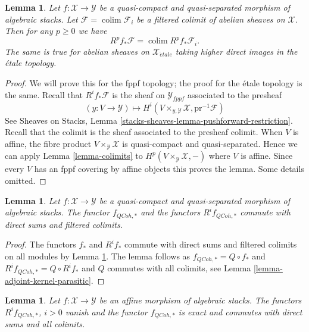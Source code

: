 \documentclass{stacks-project}
\theoremstyle{plain}
\newtheorem{lemma}[subsection]{Lemma}
\theoremstyle{definition}
\theoremstyle{remark}
\numberwithin{equation}{subsection}
\def\colim{\mathop{\mathrm{colim}}\nolimits}
\def\etale{{\acute{e}tale}}
\def\QCoh{\mathit{QCoh}}
\begin{document}
\begin{lemma}
\label{lemma-colimit-cohomology}
Let $f : \mathcal{X} \to \mathcal{Y}$ be a quasi-compact and quasi-separated
morphism of algebraic stacks. Let $\mathcal{F} = \colim \mathcal{F}_i$
be a filtered colimit of abelian sheaves on $\mathcal{X}$.
Then for any $p \geq 0$ we have
$$
R^pf_*\mathcal{F} = \colim R^pf_*\mathcal{F}_i.
$$
The same is true for abelian sheaves on $\mathcal{X}_\etale$
taking higher direct images in the \'etale topology.
\end{lemma}

\begin{proof}
We will prove this for the fppf topology; the proof for the \'etale
topology is the same. Recall that $R^if_*\mathcal{F}$ is the sheaf on
$\mathcal{Y}_{fppf}$ associated to the presheaf
$$
(y : V \to \mathcal{Y})
\longmapsto
H^i(V \times_{y, \mathcal{Y}} \mathcal{X}, \text{pr}^{-1}\mathcal{F})
$$
See
Sheaves on Stacks, Lemma \ref{stacks-sheaves-lemma-pushforward-restriction}.
Recall that the colimit is the sheaf associated to the presheaf colimit.
When $V$ is affine, the fibre product $V \times_\mathcal{Y} \mathcal{X}$
is quasi-compact and quasi-separated. Hence we can apply
Lemma \ref{lemma-colimits} to $H^p(V \times_\mathcal{Y} \mathcal{X}, -)$
where $V$ is affine. Since every $V$ has an fppf covering by
affine objects this proves the lemma. Some details omitted.
\end{proof}

\begin{lemma}
\label{lemma-quasi-coherent-pushforward-direct-sums}
Let $f : \mathcal{X} \to \mathcal{Y}$ be a quasi-compact and quasi-separated
morphism of algebraic stacks. The functor $f_{\QCoh, *}$
and the functors $R^if_{\QCoh, *}$ commute with direct sums
and filtered colimits.
\end{lemma}

\begin{proof}
The functors $f_*$ and $R^if_*$ commute with direct sums and filtered
colimits on all modules by Lemma \ref{lemma-colimit-cohomology}.
The lemma follows as $f_{\QCoh, *} = Q \circ f_*$ and
$R^if_{\QCoh, *} = Q \circ R^if_*$ and $Q$ commutes with
all colimits, see Lemma \ref{lemma-adjoint-kernel-parasitic}.
\end{proof}

\begin{lemma}
\label{lemma-quasi-coherent-pushforward-affine}
Let $f : \mathcal{X} \to \mathcal{Y}$ be an affine morphism of algebraic
stacks. The functors $R^if_{\QCoh, *}$, $i > 0$ vanish and the functor
$f_{\QCoh, *}$ is exact and commutes with direct sums and all colimits.
\end{lemma}
\end{document}

